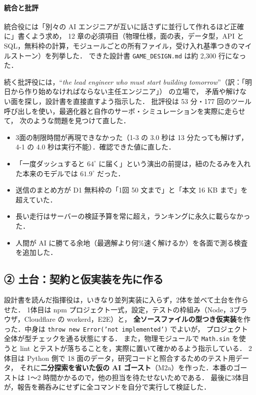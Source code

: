 \documentclass[a4paper,10pt]{ltjsarticle}
\newcommand{\code}[1]{\texttt{#1}}
\begin{document}
\paragraph{統合と批評} 統合役には「別々の AI エンジニアが互いに話さずに並行して作れるほど正確に」書くよう求め，
12 章の必須項目（物理仕様，面の表，データ型，API と SQL，無料枠の計算，モジュールごとの所有ファイル，受け入れ基準つきのマイルストーン）を列挙した．
できた設計書 \code{GAME\_DESIGN.md} は約 2,300 行になった．

続く批評役には，``\textit{the lead engineer who must start building tomorrow}''（訳：「明日から作り始めなければならない主任エンジニア」） の立場で，
矛盾や解けない面を探し，設計書を直接直すよう指示した．
批評役は 53 分・177 回のツール呼び出しを使い，最適化器と自作のサーボ・シミュレーションを実際に走らせて，
次のような問題を見つけて直した．
\begin{itemize}
  \item 3面の制限時間が再現できなかった（1-3 の 3.0 秒は 13 分たっても解けず，4-1 の 4.0 秒は実行不能）．確認できた値に直した．
  \item 「一度ダッシュすると $64^\circ$ に届く」という演出の前提は，紐のたるみを入れた本来のモデルでは $61.9^\circ$ だった．
  \item 送信のまとめ方が D1 無料枠の「1回 50 文まで」と「本文 16 KB まで」を超えていた．
  \item 長い走行はサーバーの検証予算を常に超え，ランキングに永久に載らなかった．
  \item 人間が AI に勝てる余地（最適解より何\%速く解けるか）を各面で測る検査を追加した．
\end{itemize}

\subsection{② 土台：契約と仮実装を先に作る}

設計書を読んだ指揮役は，いきなり並列実装に入らず，2体を並べて土台を作らせた．
1体目は npm プロジェクト一式，設定，テストの枠組み（Node，3ブラウザ，Cloudflare の workerd，E2E）と，
\textbf{全ソースファイルの型つき仮実装}を作った．中身は \code{throw new Error('not implemented')} でよいが，
プロジェクト全体が型チェックを通る状態にする．
また，物理モジュールで \code{Math.sin} を使うと lint とテストが落ちることを，実際に置いて確かめるよう指示している．
2体目は Python 側で 18 面のデータ，研究コードと照合するためのテスト用データ，
それに\textbf{二分探索を省いた仮の AI ゴースト}（M2a）を作った．本番のゴーストは 1〜2 時間かかるので，他の担当を待たせないためである．
最後に3体目が，報告を鵜呑みにせずに全コマンドを自分で実行して検証した．
\end{document}
